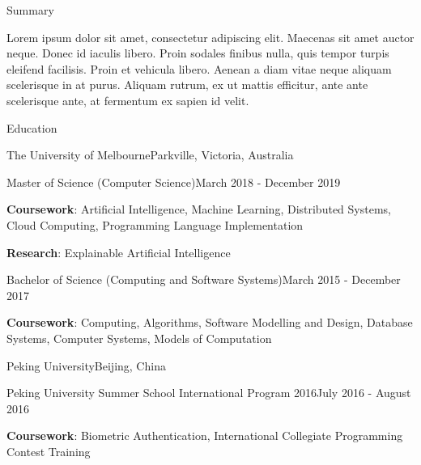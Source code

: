 \documentclass{xsha}
\begin{document}
\address{
\textbf{Phone} +86 136******** $\cdot$\space
\textbf{Email} \href{mailto:luo@jiahai.co}{luo@jiahai.co} $\cdot$\space
\textbf{LinkedIn} \href{https://linkedin.com/in/luojiahai/}{in/luojiahai} $\cdot$\space
\textbf{GitHub} \href{https://github.com/luojiahai/}{luojiahai} $\cdot$\space
\textbf{Site} \href{https://luojiahai.com/}{luojiahai.com}
}

\begin{xsection}{Summary}
\item Lorem ipsum dolor sit amet, consectetur adipiscing elit. Maecenas sit amet auctor neque. Donec id iaculis libero. Proin sodales finibus nulla, quis tempor turpis eleifend facilisis. Proin et vehicula libero. Aenean a diam vitae neque aliquam scelerisque in at purus. Aliquam rutrum, ex ut mattis efficitur, ante ante scelerisque ante, at fermentum ex sapien id velit.
\end{xsection}

\begin{xsection}{Education}

\begin{xheading}{The University of Melbourne}{Parkville, Victoria, Australia}
\begin{xsubheading}{Master of Science (Computer Science)}{March 2018 - December 2019}
\item \textbf{Coursework}: Artificial Intelligence, Machine Learning, Distributed Systems, Cloud Computing, Programming Language Implementation
\item \textbf{Research}: Explainable Artificial Intelligence
\end{xsubheading}
\begin{xsubheading}{Bachelor of Science (Computing and Software Systems)}{March 2015 - December 2017}
\item \textbf{Coursework}: Computing, Algorithms, Software Modelling and Design, Database Systems, Computer Systems, Models of Computation
\end{xsubheading}
\end{xheading}

\begin{xheading}{Peking University}{Beijing, China}
\begin{xsubheading}{Peking University Summer School International Program 2016}{July 2016 - August 2016}
\item \textbf{Coursework}: Biometric Authentication, International Collegiate Programming Contest Training
\end{xsubheading}
\end{xheading}

\end{xsection}
\end{document}
